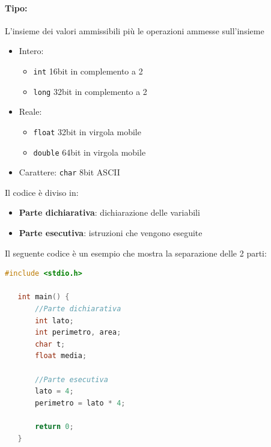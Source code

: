 \documentclass[a4paper]{article}
\theoremstyle{break}
\theoremstyle{break}
\theoremstyle{break}
\theoremstyle{break}
\begin{document}
\paragraph{Tipo:} L'insieme dei valori ammissibili più le operazioni ammesse sull'insieme
\begin{itemize}
	\item Intero:
	      \begin{itemize}
		      \item \texttt{int} 16bit in complemento a 2
		      \item \texttt{long} 32bit in complemento a 2
	      \end{itemize}
	\item Reale:
	      \begin{itemize}
		      \item \texttt{float} 32bit in virgola mobile
		      \item \texttt{double} 64bit in virgola mobile
	      \end{itemize}
	\item Carattere: \texttt{char} 8bit ASCII
\end{itemize}
Il codice è diviso in:
\begin{itemize}
	\item \textbf{Parte dichiarativa}: dichiarazione delle variabili
	\item \textbf{Parte esecutiva}: istruzioni che vengono eseguite
\end{itemize}
Il seguente codice è un esempio che mostra la separazione delle 2 parti:
\begin{lstlisting}[language=C]
   #include <stdio.h> 

   int main() {
       //Parte dichiarativa
       int lato;
       int perimetro, area;
       char t;
       float media;

       //Parte esecutiva
       lato = 4;
       perimetro = lato * 4;

       return 0;
   }
\end{lstlisting}
\end{document}
